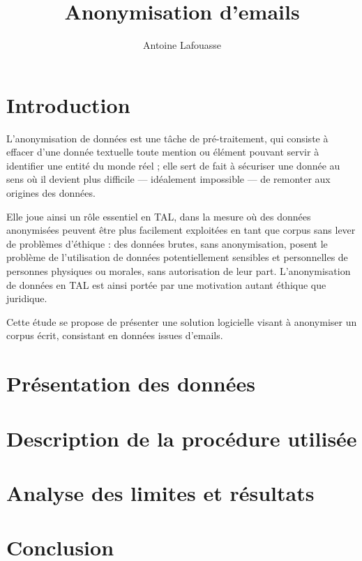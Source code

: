 \documentclass{article}
\title{Anonymisation d'emails}
\author{Antoine Lafouasse}
\begin{document}
\maketitle

\section*{Introduction}

L'anonymisation de données est une tâche de pré-traitement, qui consiste à
effacer d'une donnée textuelle toute mention ou élément pouvant servir à
identifier une entité du monde réel ; elle sert de fait à sécuriser une donnée
au sens où il devient plus difficile --- idéalement impossible --- de remonter
aux origines des données.

Elle joue ainsi un rôle essentiel en TAL, dans la mesure où des données
anonymisées peuvent être plus facilement exploitées en tant que corpus sans
lever de problèmes d'éthique : des données brutes, sans anonymisation, posent
le problème de l'utilisation de données potentiellement sensibles et
personnelles de personnes physiques ou morales, sans autorisation de leur part.
L'anonymisation de données en TAL est ainsi portée par une motivation autant
éthique que juridique.

Cette étude se propose de présenter une solution logicielle visant à anonymiser
un corpus écrit, consistant en données issues d'emails.

\section{Présentation des données}

\section{Description de la procédure utilisée}

\section{Analyse des limites et résultats}

\section*{Conclusion}

\newpage
\tableofcontents
\end{document}
